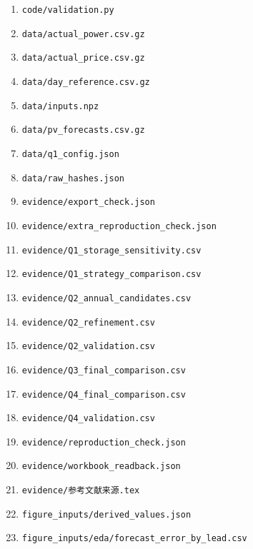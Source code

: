 \begin{enumerate}[label=\arabic*.,leftmargin=2.5em,itemsep=2pt]
\item \texttt{code/\allowbreak{}validation.py}
\item \texttt{data/\allowbreak{}actual\_\allowbreak{}power.csv.gz}
\item \texttt{data/\allowbreak{}actual\_\allowbreak{}price.csv.gz}
\item \texttt{data/\allowbreak{}day\_\allowbreak{}reference.csv.gz}
\item \texttt{data/\allowbreak{}inputs.npz}
\item \texttt{data/\allowbreak{}pv\_\allowbreak{}forecasts.csv.gz}
\item \texttt{data/\allowbreak{}q1\_\allowbreak{}config.json}
\item \texttt{data/\allowbreak{}raw\_\allowbreak{}hashes.json}
\item \texttt{evidence/\allowbreak{}export\_\allowbreak{}check.json}
\item \texttt{evidence/\allowbreak{}extra\_\allowbreak{}reproduction\_\allowbreak{}check.json}
\item \texttt{evidence/\allowbreak{}Q1\_\allowbreak{}storage\_\allowbreak{}sensitivity.csv}
\item \texttt{evidence/\allowbreak{}Q1\_\allowbreak{}strategy\_\allowbreak{}comparison.csv}
\item \texttt{evidence/\allowbreak{}Q2\_\allowbreak{}annual\_\allowbreak{}candidates.csv}
\item \texttt{evidence/\allowbreak{}Q2\_\allowbreak{}refinement.csv}
\item \texttt{evidence/\allowbreak{}Q2\_\allowbreak{}validation.csv}
\item \texttt{evidence/\allowbreak{}Q3\_\allowbreak{}final\_\allowbreak{}comparison.csv}
\item \texttt{evidence/\allowbreak{}Q4\_\allowbreak{}final\_\allowbreak{}comparison.csv}
\item \texttt{evidence/\allowbreak{}Q4\_\allowbreak{}validation.csv}
\item \texttt{evidence/\allowbreak{}reproduction\_\allowbreak{}check.json}
\item \texttt{evidence/\allowbreak{}workbook\_\allowbreak{}readback.json}
\item \texttt{evidence/\allowbreak{}参考文献来源.tex}
\item \texttt{figure\_\allowbreak{}inputs/\allowbreak{}derived\_\allowbreak{}values.json}
\item \texttt{figure\_\allowbreak{}inputs/\allowbreak{}eda/\allowbreak{}forecast\_\allowbreak{}error\_\allowbreak{}by\_\allowbreak{}lead.csv}

\end{enumerate}
